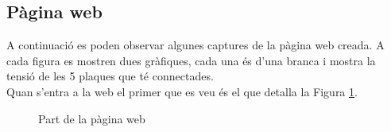 \begin{spacing}{1.5}

\section{Pàgina web}
\noindent A continuació es poden observar algunes captures de la pàgina web creada. A cada figura es mostren dues gràfiques, cada una és d'una branca i mostra la tensió de les 5 plaques que té connectades.\\
\newline Quan s'entra a la web el primer que es veu és el que detalla la Figura \ref{fig:1}.

\begin{figure}[H]
\begin{center}
\end{center}
\caption{Part de la pàgina web}
\label{fig:1}
\end{figure}


\end{spacing}
